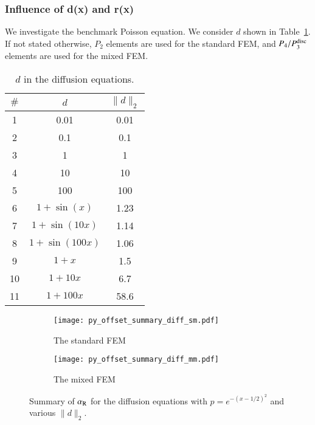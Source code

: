 \documentclass[review,3p]{elsarticle}
\begin{document}
\newpage

\subsubsection{Influence of d(x) and r(x)}

We investigate the benchmark Poisson equation.
We consider $d$ shown in Table~\ref{d_diffusion_equations}.
If not stated otherwise, $P_2$ elements are used for the standard FEM, and $P_4/P_3^{\rm disc}$ elements are used for the mixed FEM.

\begin{table}[!ht]
\centering
\caption [w]{$d$ in the diffusion equations.} 
\label{d_diffusion_equations}
 \begin{tabular}{c c c} \hline      
$\#$ &$d$ & $\|d\|_2$  \\ \hline
1 & 0.01 & 0.01 \\ \hline
2 & 0.1 & 0.1 \\ \hline
3 & 1 & 1 \\ \hline
4 & 10 & 10 \\ \hline
5 & 100 & 100 \\ \hline
6 & $1+\sin(x)$ & 1.23 \\ \hline
7 & $1+\sin(10x)$ & 1.14 \\ \hline
8 & $1+\sin(100x)$ & 1.06 \\ \hline
9 & $1+x$ & 1.5 \\ \hline
10 & $1+10x$ & 6.7 \\ \hline
11& $1+100x$ & 58.6 \\ \hline
\end{tabular}
\end{table}



\begin{figure}[!ht]
	\hspace{2.5cm}
    \begin{subfigure}{5.4cm}
        \texttt{[image: py\_offset\_summary\_diff\_sm.pdf]}
        \caption{The standard FEM}
        \label{Fig:py_offset_summary_diff_sm}
    \end{subfigure}
    \hspace{-0.2cm}
    \begin{subfigure}{5.4cm}
        \texttt{[image: py\_offset\_summary\_diff\_mm.pdf]}
        \caption{The mixed FEM}
        \label{Fig:py_offset_summary_diff_mm}
    \end{subfigure}
\caption{Summary of $\alpha_{\rm R}$ for the diffusion equations with $p=e^{-{(x-1/2)^2}}$ and various $\|d\|_2$.}
\label{Fig:py_offset_summary_diff}
\end{figure}
\end{document}
